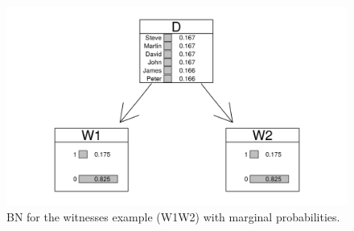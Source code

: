 \documentclass[10pt,]{scrartcl}
\begin{document}
\begin{figure}[h]
\centering
\includegraphics[width =14cm]{../images/w1w2BNv2.png}
\caption{BN for the witnesses example (W1W2) with marginal probabilities.}
\label{fig:witnessw1w2}
\end{figure}







\end{document}
